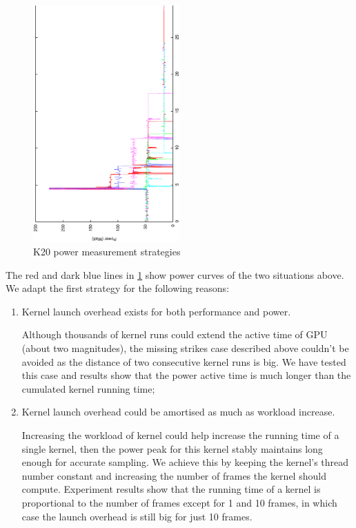 \documentclass[titlepage]{article}
\numberwithin{figure}{section}
\numberwithin{equation}{section}
\begin{document}
\begin{figure}[htbp]
  \centering
  \includegraphics[angle=-90,width=0.5\textwidth]{k20power_merge}
  \caption{K20 power measurement strategies}
  \label{fig:k20power_merge}
\end{figure}

The red and dark blue lines in \ref{fig:k20power_merge} show power curves of the two situations above. We adapt the first strategy for the following reasons:

\begin{enumerate}
\item Kernel launch overhead exists for both performance and power.

  Although thousands of kernel runs could extend the active time of GPU (about two magnitudes), the missing strikes case described above couldn't be avoided as the distance of two consecutive kernel runs is big. We have tested this case and results show that the power active time is much longer than the cumulated kernel running time;

\item Kernel launch overhead could be amortised as much as workload increase.

  Increasing the workload of kernel could help increase the running time of a single kernel, then the power peak for this kernel stably maintains long enough for accurate sampling. We achieve this by keeping the kernel's thread number constant and increasing the number of frames the kernel should compute. Experiment results show that the running time of a kernel is proportional to the number of frames except for 1 and 10 frames, in which case the launch overhead is still big for just 10 frames. 
\end{enumerate}
\end{document}
